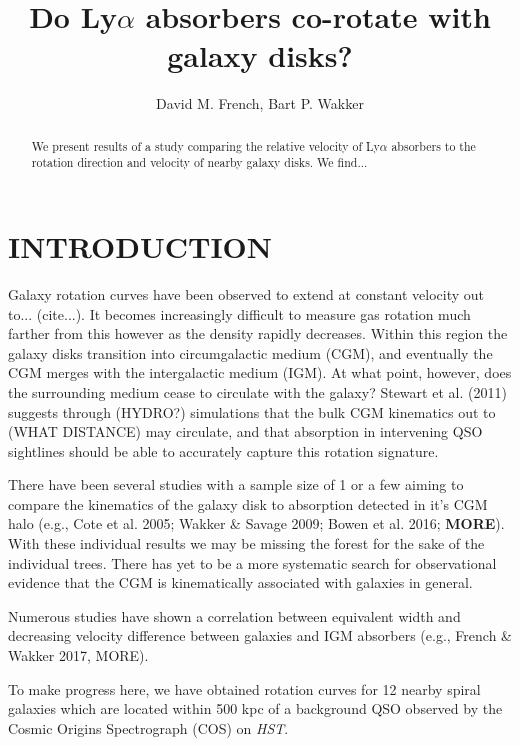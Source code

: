 \documentclass[iop]{emulateapj-rtx4}
\begin{document}
\title{Do Ly$\alpha$ absorbers co-rotate with galaxy disks?}

\author{David M. French, Bart P. Wakker}


\begin{abstract}

We present results of a study comparing the relative velocity of Ly$\alpha$ absorbers to the rotation direction and velocity of nearby galaxy disks. We find...

\end{abstract}




\section{INTRODUCTION}
Galaxy rotation curves have been observed to extend at constant velocity out to... (cite...). It becomes increasingly difficult to measure gas rotation much farther from this however as the density rapidly decreases. Within this region the galaxy disks transition into circumgalactic medium (CGM), and eventually the CGM merges with the intergalactic medium (IGM). At what point, however, does the surrounding medium cease to circulate with the galaxy? Stewart et al. (2011) suggests through (HYDRO?) simulations that the bulk CGM kinematics out to (WHAT DISTANCE) may circulate, and that absorption in intervening QSO sightlines should be able to accurately capture this rotation signature.

There have been several studies with a sample size of 1 or a few aiming to compare the kinematics of the galaxy disk to absorption detected in it's CGM halo (e.g., Cote et al. 2005; Wakker \& Savage 2009; Bowen et al. 2016; \textbf{MORE}). With these individual results we may be missing the forest for the sake of the individual trees. There has yet to be a more systematic search for observational evidence that the CGM is kinematically associated with galaxies in general.

Numerous studies have shown a correlation between equivalent width and decreasing velocity difference between galaxies and IGM absorbers (e.g., French \& Wakker 2017, MORE).

To make progress here, we have obtained rotation curves for 12 nearby spiral galaxies which are located within 500 kpc of a background QSO observed by the Cosmic Origins Spectrograph (COS) on \textit{HST}. 
\end{document}
